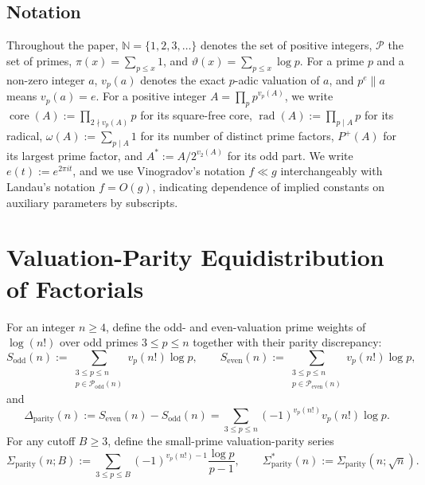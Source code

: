 \documentclass[11pt,reqno]{amsart}
\theoremstyle{remark}
\newcommand{\N}{\mathbb{N}}
\newcommand{\Pset}{\mathcal{P}}
\newcommand{\Podd}{\mathcal{P}_{\mathrm{odd}}}
\newcommand{\Peven}{\mathcal{P}_{\mathrm{even}}}
\newcommand{\core}{\operatorname{core}}
\newcommand{\rad}{\operatorname{rad}}
\begin{document}
\subsection{Notation}
Throughout the paper, $\N = \{1, 2, 3, \dots\}$ denotes the set of positive integers, $\Pset$ the set of primes, $\pi(x) = \sum_{p \le x} 1$, and $\vartheta(x) = \sum_{p \le x} \log p$. For a prime $p$ and a non-zero integer $a$, $v_p(a)$ denotes the exact $p$-adic valuation of $a$, and $p^e \parallel a$ means $v_p(a) = e$. For a positive integer $A = \prod_p p^{v_p(A)}$, we write $\core(A) := \prod_{2 \nmid v_p(A)} p$ for its square-free core, $\rad(A) := \prod_{p \mid A} p$ for its radical, $\omega(A) := \sum_{p \mid A} 1$ for its number of distinct prime factors, $P^+(A)$ for its largest prime factor, and $A^* := A / 2^{v_2(A)}$ for its odd part. We write $e(t) := e^{2\pi i t}$, and we use Vinogradov's notation $f \ll g$ interchangeably with Landau's notation $f = O(g)$, indicating dependence of implied constants on auxiliary parameters by subscripts.

\section{Valuation-Parity Equidistribution of Factorials}

For an integer $n \ge 4$, define the odd- and even-valuation prime weights of $\log(n!)$ over odd primes $3 \le p \le n$ together with their parity discrepancy:
\begin{equation}\label{eq:sodd-seven}
S_{\mathrm{odd}}(n) := \sum_{\substack{3 \le p \le n \\ p \in \Podd(n)}} v_p(n!) \log p, \qquad
S_{\mathrm{even}}(n) := \sum_{\substack{3 \le p \le n \\ p \in \Peven(n)}} v_p(n!) \log p,
\end{equation}
and
\begin{equation}\label{eq:delta-parity}
\Delta_{\mathrm{parity}}(n) := S_{\mathrm{even}}(n) - S_{\mathrm{odd}}(n) = \sum_{3 \le p \le n} (-1)^{v_p(n!)} v_p(n!) \log p.
\end{equation}
For any cutoff $B \ge 3$, define the small-prime valuation-parity series
\begin{equation}\label{eq:sigma-parity}
\Sigma_{\mathrm{parity}}(n; B) := \sum_{3 \le p \le B} (-1)^{v_p(n!)-1} \frac{\log p}{p - 1}, \qquad \Sigma^*_{\mathrm{parity}}(n) := \Sigma_{\mathrm{parity}}(n; \sqrt{n}).
\end{equation}
\end{document}
